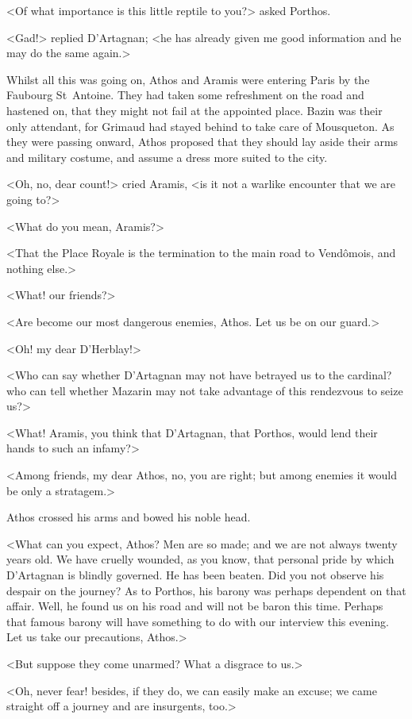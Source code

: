 <Of what importance is this little reptile to you?> asked Porthos.

<Gad!> replied D'Artagnan; <he has already given me good information and he may do the same again.>

Whilst all this was going on, Athos and Aramis were entering Paris by the Faubourg St~Antoine. They had taken some refreshment on the road and hastened on, that they might not fail at the appointed place. Bazin was their only attendant, for Grimaud had stayed behind to take care of Mousqueton. As they were passing onward, Athos proposed that they should lay aside their arms and military costume, and assume a dress more suited to the city.

<Oh, no, dear count!> cried Aramis, <is it not a warlike encounter that we are going to?>

<What do you mean, Aramis?>

<That the Place Royale is the termination to the main road to Vendômois, and nothing else.>

<What! our friends?>

<Are become our most dangerous enemies, Athos. Let us be on our guard.>

<Oh! my dear D'Herblay!>

<Who can say whether D'Artagnan may not have betrayed us to the cardinal? who can tell whether Mazarin may not take advantage of this rendezvous to seize us?>

<What! Aramis, you think that D'Artagnan, that Porthos, would lend their hands to such an infamy?>

<Among friends, my dear Athos, no, you are right; but among enemies it would be only a stratagem.>

Athos crossed his arms and bowed his noble head.

<What can you expect, Athos? Men are so made; and we are not always twenty years old. We have cruelly wounded, as you know, that personal pride by which D'Artagnan is blindly governed. He has been beaten. Did you not observe his despair on the journey? As to Porthos, his barony was perhaps dependent on that affair. Well, he found us on his road and will not be baron this time. Perhaps that famous barony will have something to do with our interview this evening. Let us take our precautions, Athos.>

<But suppose they come unarmed? What a disgrace to us.>

<Oh, never fear! besides, if they do, we can easily make an excuse; we came straight off a journey and are insurgents, too.>

